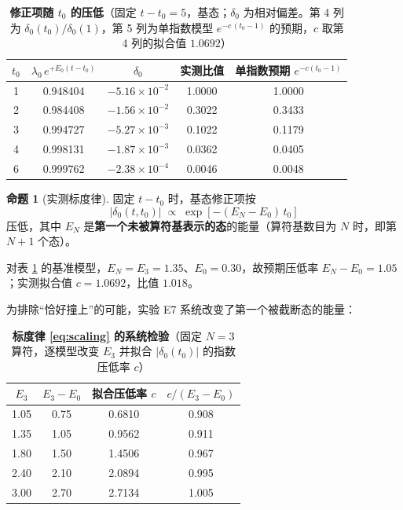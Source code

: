 \documentclass[12pt,a4paper]{ctexart}
\theoremstyle{definition}
\newtheorem{proposition}{命题}[section]
\begin{document}
\begin{table}[htbp]
\centering
\caption{\textbf{修正项随 $t_0$ 的压低}（固定 $t-t_0=5$，基态；$\delta_0$ 为相对偏差。第 4 列为 $\delta_0(t_0)/\delta_0(1)$，第 5 列为单指数模型 $e^{-c\,(t_0-1)}$ 的预期，$c$ 取第 4 列的拟合值 $1.0692$）}
\label{tab:t0supp}
\begin{tabular}{ccccc}
\toprule
$t_0$ & $\lambda_0\,e^{+E_0(t-t_0)}$ & $\delta_0$ & 实测比值 & 单指数预期 $e^{-c(t_0-1)}$ \\
\midrule
1 & 0.948404 & $-5.16\times10^{-2}$ & 1.0000 & 1.0000 \\
2 & 0.984408 & $-1.56\times10^{-2}$ & 0.3022 & 0.3433 \\
3 & 0.994727 & $-5.27\times10^{-3}$ & 0.1022 & 0.1179 \\
4 & 0.998131 & $-1.87\times10^{-3}$ & 0.0362 & 0.0405 \\
6 & 0.999762 & $-2.38\times10^{-4}$ & 0.0046 & 0.0048 \\
\bottomrule
\end{tabular}
\end{table}

\begin{proposition}[实测标度律]\label{prop:scaling}
固定 $t-t_0$ 时，基态修正项按
\begin{equation}
|\delta_0(t,t_0)| \;\propto\; \exp\!\left[-(E_N - E_0)\, t_0\right]
\label{eq:scaling}
\end{equation}
压低，其中 $E_N$ 是\textbf{第一个未被算符基表示的态}的能量（算符基数目为 $N$ 时，即第 $N+1$ 个态）。
\end{proposition}

对表 \ref{tab:t0supp} 的基准模型，$E_N = E_3 = 1.35$、$E_0=0.30$，故预期压低率 $E_N-E_0 = 1.05$；实测拟合值 $c = 1.0692$，比值 $1.018$。

为排除``恰好撞上''的可能，实验 E7 系统改变了第一个被截断态的能量：

\begin{table}[htbp]
\centering
\caption{\textbf{标度律 \eqref{eq:scaling} 的系统检验}（固定 $N=3$ 算符，逐模型改变 $E_3$ 并拟合 $|\delta_0(t_0)|$ 的指数压低率 $c$）}
\label{tab:scaling}
\begin{tabular}{cccc}
\toprule
$E_3$ & $E_3 - E_0$ & 拟合压低率 $c$ & $c/(E_3-E_0)$ \\
\midrule
1.05 & 0.75 & 0.6810 & 0.908 \\
1.35 & 1.05 & 0.9562 & 0.911 \\
1.80 & 1.50 & 1.4506 & 0.967 \\
2.40 & 2.10 & 2.0894 & 0.995 \\
3.00 & 2.70 & 2.7134 & 1.005 \\
\bottomrule
\end{tabular}
\end{table}
\end{document}
